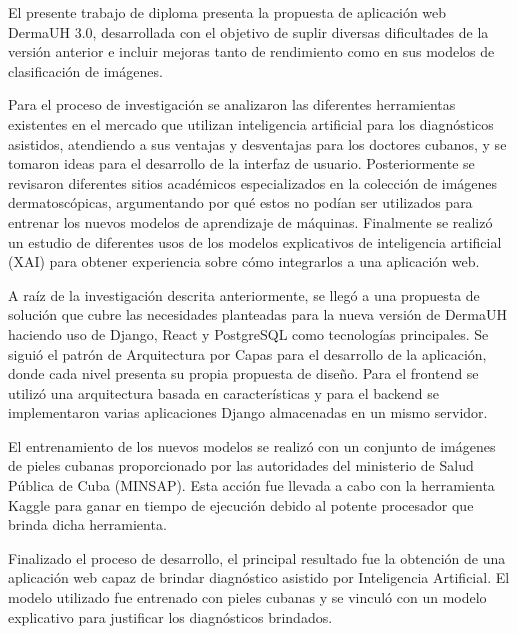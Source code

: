 \begin{resumen}
	El presente trabajo de diploma presenta la propuesta de aplicación web DermaUH 3.0, 
	desarrollada con el objetivo de suplir diversas dificultades de la versión anterior e 
	incluir mejoras tanto de rendimiento como en sus modelos de clasificación de imágenes.

	Para el proceso de investigación se analizaron las diferentes herramientas existentes 
	en el mercado que utilizan inteligencia artificial para los diagnósticos asistidos, 
	atendiendo a sus ventajas y desventajas para los doctores cubanos, y se tomaron ideas 
	para el desarrollo de la interfaz de usuario. Posteriormente se revisaron diferentes 
	sitios académicos especializados en la colección de imágenes dermatoscópicas, 
	argumentando por qué estos no podían ser utilizados para entrenar los nuevos modelos 
	de aprendizaje de máquinas. Finalmente se realizó un estudio de diferentes usos de los 
	modelos explicativos de inteligencia artificial (XAI) para obtener experiencia sobre 
	cómo integrarlos a una aplicación web.

	A raíz de la investigación descrita anteriormente, se llegó a una propuesta de 
	solución que cubre las necesidades planteadas para la nueva versión de DermaUH 
	haciendo uso de Django, React y PostgreSQL como tecnologías principales. Se siguió el 
	patrón de Arquitectura por Capas para el desarrollo de la aplicación, donde cada nivel 
	presenta su propia propuesta de diseño. Para el frontend se utilizó una arquitectura 
	basada en características y para el backend se implementaron varias aplicaciones 
	Django almacenadas en un mismo servidor.

	El entrenamiento de los nuevos modelos se realizó con un conjunto de imágenes de 
	pieles cubanas proporcionado por las autoridades del ministerio de Salud Pública de 
	Cuba (MINSAP). Esta acción fue llevada a cabo con la herramienta Kaggle para ganar 
	en tiempo de ejecución debido al potente procesador que brinda dicha herramienta.

	Finalizado el proceso de desarrollo, el principal resultado fue la obtención de una 
	aplicación web capaz de brindar diagnóstico asistido por Inteligencia Artificial. 
	El modelo utilizado fue entrenado con pieles cubanas y se vinculó con un modelo 
	explicativo para justificar los diagnósticos brindados.
\end{resumen}

